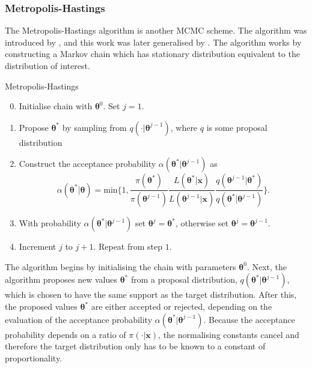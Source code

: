 \subsubsection{Metropolis-Hastings}
\label{sssec:metropolis_hastings}
The Metropolis-Hastings algorithm is another MCMC scheme. The algorithm was introduced by \cite{metropolis53}, and this work was later generalised by \cite{hastings70}. The algorithm works by constructing a Markov chain which has stationary distribution equivalent to the distribution of interest.
\begin{algorithm}
\caption{Metropolis-Hastings}
\label{alg:metropolis_hastings}
\begin{enumerate}
    \setcounter{enumi}{-1}
    \item Initialise chain with $\bm{\theta}^{0}$. Set $j=1$.
    \item Propose ${\bm{\theta}}^*$ by sampling from $q(\cdot|{\bm{\theta}}^{j-1})$, where $q$ is some proposal distribution
    \item Construct the acceptance probability $\alpha({\bm{\theta}}^*|{\bm{\theta}^{j-1}})$ as
    \begin{equation*}
		\alpha({\bm{\theta}}^*|\bm{\theta}) = \text{min}\bigg\{ 1, \frac{\pi({\bm{\theta}}^*)}{\pi({\bm{\theta}}^{j-1})} \frac{L(\bm{\theta}^*|\bm{x})}{L({\bm{\theta}}^{j-1}|\bm{x})} \frac{q({\bm{\theta}}^{j-1}|{\bm{\theta}}^*)}{q({\bm{\theta}}^*|{\bm{\theta}}^{j-1})} \bigg\}.
    \end{equation*}
    \item With probability $\alpha({\bm{\theta}}^*|{\bm{\theta}^{j-1}})$ set ${\bm{\theta}}^j = {\bm{\theta}}^*$, otherwise set ${\bm{\theta}}^j = {\bm{\theta}}^{j-1}$.
    \item Increment $j$ to $j+1$. Repeat from step $1$.
\end{enumerate}
\end{algorithm}

The algorithm begins by initialising the chain with parameters $\bm{\theta}^{0}$. Next, the algorithm proposes new values ${\bm{\theta}}^*$ from a proposal distribution, $q(\bm{\theta}^*|{\bm{\theta}}^{j-1})$, which is chosen to have the same support as the target distribution. After this, the proposed values ${\bm{\theta}}^*$ are either accepted or rejected, depending on the evaluation of the acceptance probability $\alpha({\bm{\theta}}^*|{\bm{\theta}^{j-1}})$. Because the acceptance probability depends on a ratio of $\pi(\cdot|\bm{x})$, the normalising constants cancel and therefore the target distribution only has to be known to a constant of proportionality.

